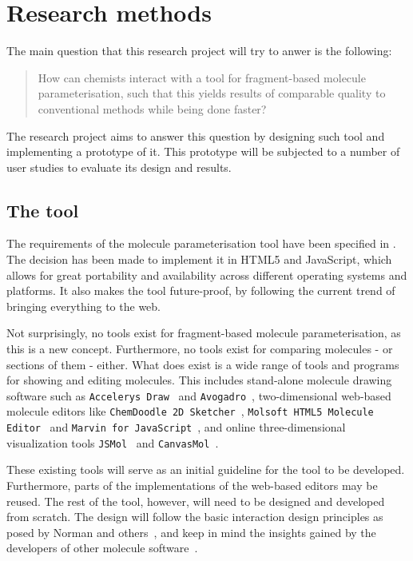 \chapter{Research methods}

The main question that this research project will try to anwer is the following:
\begin{quote}
How can chemists interact with a tool for fragment-based molecule parameterisation, such that this yields results of comparable quality to conventional methods while being done faster?
\end{quote}
The research project aims to answer this question by designing such tool and implementing a prototype of it. This prototype will be subjected to a number of user studies to evaluate its design and results.


\section{The tool}

The requirements of the molecule parameterisation tool have been specified in . The decision has been made to implement it in HTML5 and JavaScript, which allows for great portability and availability across different operating systems and platforms. It also makes the tool future-proof, by following the current trend of bringing everything to the web.

Not surprisingly, no tools exist for fragment-based molecule parameterisation, as this is a new concept. Furthermore, no tools exist for comparing molecules - or sections of them - either. What does exist is a wide range of tools and programs for showing and editing molecules. This includes stand-alone molecule drawing software such as \verb|Accelerys Draw|~\cite{accelrys2012accelrys} and \verb|Avogadro|~\cite{hanwell2012avogadro}, two-dimensional web-based molecule editors like \verb|ChemDoodle 2D Sketcher|~\cite{ichemlabs2013chemdoodle}, \verb|Molsoft HTML5 Molecule Editor|~\cite{molsoft2012molsoft} and \verb|Marvin for JavaScript|~\cite{chemxon2013marvin}, and online three-dimensional visualization tools \verb|JSMol|~\cite{hanson2013jsmol} and \verb|CanvasMol|~\cite{altered2013canvasmol}.

These existing tools will serve as an initial guideline for the tool to be developed. Furthermore, parts of the implementations of the web-based editors may be reused. The rest of the tool, however, will need to be designed and developed from scratch. The design will follow the basic interaction design principles as posed by Norman and others~\cite{norman2002design, norman1990interfaces, norman2002emotion, norman2005human, norman2010gestural, thimbleby2007press, blair2008user, badre2002shaping}, and keep in mind the insights gained by the developers of other molecule software~\cite{ertl2010molecular, hanson2013jsmol, bienfait2013jsme, ekins2013tb}.


